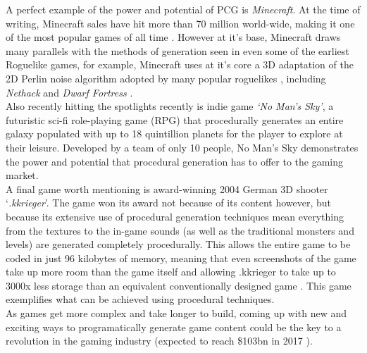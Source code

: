 \documentclass[12pt,a4paper]{article}
\begin{document}

A perfect example of the power and potential of PCG is \emph{Minecraft}. At the time of writing, Minecraft sales have hit more than 70 million world-wide, making it one of the most popular games of all time \cite{ukie}. However at it's base, Minecraft draws many parallels with the methods of generation seen in even some of the earliest Roguelike games, for example, Minecraft uses at it's core a 3D adaptation of the 2D Perlin noise algorithm adopted by many popular roguelikes \cite{notch}, including \emph{Nethack} and \emph{Dwarf Fortress} \cite{Dunhack}.\\

Also recently hitting the spotlights recently is indie game \emph{`No Man's Sky'}, a futuristic sci-fi role-playing game (RPG) that procedurally generates an entire galaxy populated with up to 18 quintillion planets for the player to explore at their leisure. Developed by a team of only 10 people, No Man's Sky demonstrates the power and potential that procedural generation has to offer to the gaming market. \\

A final game worth mentioning is award-winning 2004 German 3D shooter `\emph{.kkrieger}'. The game won its award not because of its content however, but because its extensive use of procedural generation techniques mean everything from the textures to the in-game sounds (as well as the traditional monsters and levels) are generated completely procedurally. This allows the entire game to be coded in just 96 kilobytes of memory, meaning that even screenshots of the game take up more room than the game itself and allowing .kkrieger to take up to 3000x less storage than an equivalent conventionally designed game \cite{kkrieger}. This game exemplifies what can be achieved using procedural techniques.\\

As games get more complex and take longer to build, coming up with new and exciting ways to programatically generate game content could be the key to a revolution in the gaming industry (expected to reach \$103bn in 2017 \cite{newzoo}).
\end{document}
